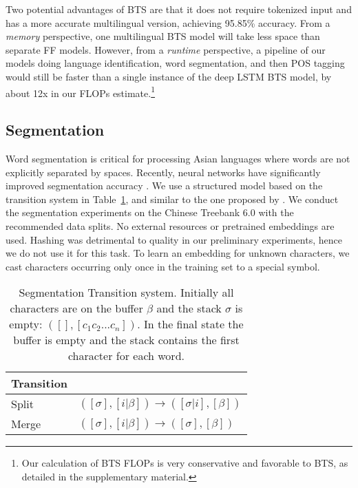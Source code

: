 \documentclass[11pt,letterpaper]{article}
\begin{document}
Two potential advantages of BTS are that it does not require tokenized input and has a more accurate multilingual version, achieving 95.85\% accuracy.
From a \emph{memory} perspective, one multilingual BTS model will take less space than
separate FF models.  
However, from a \emph{runtime} perspective, a pipeline of our models doing language identification,
word segmentation, and then POS tagging would still be faster than a single instance of the deep LSTM BTS model, by about 12x in our FLOPs estimate.\footnote{Our calculation of BTS FLOPs is very conservative and favorable to BTS, as detailed in the supplementary material.}

\subsection{Segmentation}
Word segmentation is critical for processing Asian languages where words are not explicitly separated by spaces.
Recently, neural networks have significantly improved segmentation accuracy
\cite{zhang-zhang-fu:2016:P16-1,cai-zhao:2016:P16-1,DBLP:conf/ijcai/LiuCGQL16, DBLP:journals/corr/YangZD17, DBLP:journals/corr/KongDS15}.
  We use a structured model based on the transition system in Table~\ref{tab:segmentationtransitions}, and similar to the one proposed by .
We conduct the segmentation experiments on the Chinese Treebank 6.0 with the recommended data splits. No external resources or pretrained embeddings are used.
Hashing was detrimental to quality in our preliminary experiments, hence we do not use it for this task.
To learn an embedding for unknown characters, we cast characters occurring only once in the training set to a special symbol.

\begin{table}[t]
\begin{tabular}{ll}
\bf Transition & \\
\hline
{\sc Split} & $([\sigma], [i|\beta]) \rightarrow ([\sigma | i], [\beta])$  \\
{\sc Merge} & $([\sigma], [i | \beta]) \rightarrow ([\sigma], [\beta])$  \\
\end{tabular}
\caption{Segmentation Transition system.  Initially all characters are on the buffer $\beta$ and the stack $\sigma$ is empty:
$([], [c_1 c_2 ... c_n])$.  In the final state the buffer is empty and the stack contains the first character for each word.}
\label{tab:segmentationtransitions}
\end{table}
\end{document}
